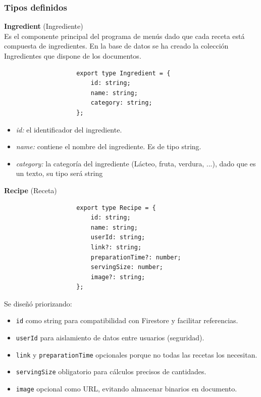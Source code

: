 \documentclass[twoside, openright, 11pt]{report}
\begin{document}
			\subsubsection{Tipos definidos \\}
			
				\textbf{Ingredient} (Ingrediente)\\
				Es el componente principal del programa de menús dado que cada receta está compuesta de ingredientes. En la base de datos se ha creado la colección Ingredientes que dispone de los documentos.
				\\
				\begin{lstlisting}
					export type Ingredient = {
						id: string;
						name: string;
						category: string;
					};
				\end{lstlisting}
				
				\begin{itemize}
					\item \textit{id:} el identificador del ingrediente.
					\item \textit{name:} contiene el nombre del ingrediente. Es de tipo string.
					\item \textit{category:} la categoría del ingrediente (Lácteo, fruta, verdura, ...), dado que es un texto, su tipo será string
				\end{itemize}
			
				
				\textbf{Recipe} (Receta)
				
				\begin{lstlisting}
					export type Recipe = {
						id: string;
						name: string;
						userId: string;
						link?: string;
						preparationTime?: number;
						servingSize: number;
						image?: string;
					};
				\end{lstlisting}
				
				Se diseñó priorizando:
				\begin{itemize}
					\item \texttt{id} como string para compatibilidad con Firestore y facilitar referencias.
					\item \texttt{userId} para aislamiento de datos entre usuarios (seguridad).
					\item \texttt{link} y \texttt{preparationTime} opcionales porque no todas las recetas los necesitan.
					\item \texttt{servingSize} obligatorio para cálculos precisos de cantidades.
					\item \texttt{image} opcional como URL, evitando almacenar binarios en documento.
				\end{itemize}
				
\end{document}
